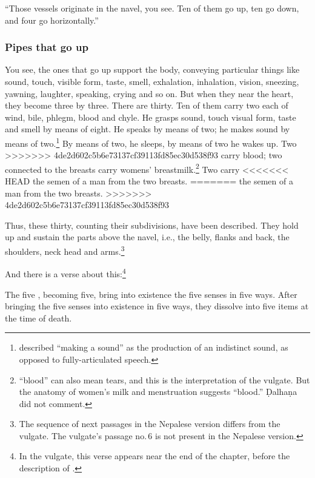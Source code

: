 \begin{refsection}
\begin{translation}
\item[4]

“Those vessels originate in the navel, you see.  Ten of them go up,
ten go down, and four go horizontally.”

\subsubsection{Pipes that go up}

\item[5]

You see, the ones that go up support the body, conveying particular
things like sound, touch, visible form, taste, smell, exhalation,
inhalation, vision, sneezing, yawning, laughter, speaking, crying and
so on.  But when they near the heart, they become three by three.
There are thirty.  Ten of them carry two each of wind, bile, phlegm,
blood and chyle. He grasps sound, touch visual form, taste and smell
by means of eight. He speaks by means of two; he makes sound by means
of two.\footnote{ described “making a sound” as
    the production of an indistinct sound, as opposed to fully-articulated
    speech.}  By means of two, he sleeps, by means of two he wakes up. Two
>>>>>>> 4de2d602c5b6e73137cf39113fd85ec30d538f93
    carry blood;  two connected to the breasts carry womens'
    breastmilk.\footnote{ “blood” can also mean tears, and this
        is the interpretation of the vulgate.  But the anatomy of women's milk
        and menstruation suggests “blood.” Ḍalhaṇa did not comment.} Two carry
<<<<<<< HEAD
    the semen of a man from the two breasts.
=======
        the semen of a man from the two breasts.
>>>>>>> 4de2d602c5b6e73137cf39113fd85ec30d538f93

    Thus, these thirty, counting their subdivisions, have been described.
    They hold up and sustain the parts above the navel, i.e., the belly,
    flanks and back, the shoulders, neck head and arms.\footnote{The sequence
        of next passages in the Nepalese version differs from the vulgate. The vulgate's
        passage no.\,6 is not present in the Nepalese version.}

    \item[11] 
    
    And there is a verse about this:\footnote{In the
    vulgate, this verse appears near the end of the chapter, before
    the description of .}
    \begin{sloka}
        The five , becoming five, bring
        into existence the five senses in five ways. After bringing the
        five senses into existence in five ways,  they dissolve into five
        items at the time of death.
    \end{sloka}



\end{translation}
\end{refsection}
